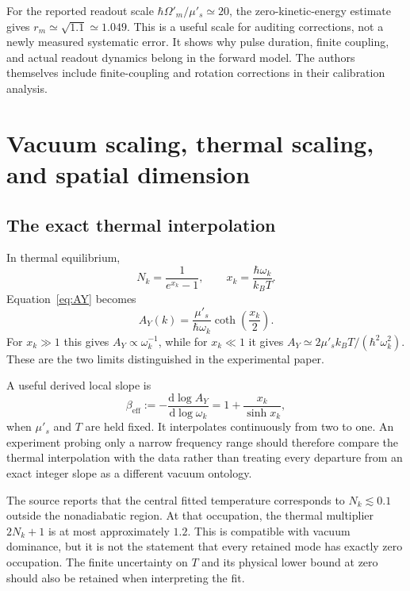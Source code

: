\documentclass[11pt,a4paper]{article}
\theoremstyle{definition}
\theoremstyle{remark}
\newcommand{\dd}{\mathrm{d}}
\newcommand{\musp}{\mu'_s}
\begin{document}
For the reported readout scale $\hbar\Omega'_m/\musp\simeq20$, the zero-kinetic-energy estimate gives $r_m\simeq\sqrt{1.1}\simeq1.049$. This is a useful scale for auditing corrections, not a newly measured systematic error. It shows why pulse duration, finite coupling, and actual readout dynamics belong in the forward model. The authors themselves include finite-coupling and rotation corrections in their calibration analysis.\cite{zhang2026}

\section{Vacuum scaling, thermal scaling, and spatial dimension}
\label{sec:spectrum}
\subsection{The exact thermal interpolation}
In thermal equilibrium,
\begin{equation}
 N_k=\frac{1}{e^{x_k}-1},\qquad
 x_k=\frac{\hbar\omega_k}{k_BT}.
 \label{eq:occupation}
\end{equation}
Equation~\eqref{eq:AY} becomes
\begin{equation}
 A_Y(k)=\frac{\musp}{\hbar\omega_k}
 \coth\!\left(\frac{x_k}{2}\right).
 \label{eq:coth}
\end{equation}
For $x_k\gg1$ this gives $A_Y\propto\omega_k^{-1}$, while for $x_k\ll1$ it gives $A_Y\simeq2\musp k_BT/(\hbar^2\omega_k^2)$. These are the two limits distinguished in the experimental paper.\cite{zhang2026}

A useful derived local slope is
\begin{equation}
 \beta_{\mathrm{eff}}
 :=-\frac{\dd\log A_Y}{\dd\log\omega_k}
 =1+\frac{x_k}{\sinh x_k},
 \label{eq:slope}
\end{equation}
when $\musp$ and $T$ are held fixed. It interpolates continuously from two to one. An experiment probing only a narrow frequency range should therefore compare the thermal interpolation with the data rather than treating every departure from an exact integer slope as a different vacuum ontology.

The source reports that the central fitted temperature corresponds to $N_k\lesssim0.1$ outside the nonadiabatic region. At that occupation, the thermal multiplier $2N_k+1$ is at most approximately $1.2$. This is compatible with vacuum dominance, but it is not the statement that every retained mode has exactly zero occupation. The finite uncertainty on $T$ and its physical lower bound at zero should also be retained when interpreting the fit.\cite{zhang2026}
\end{document}
